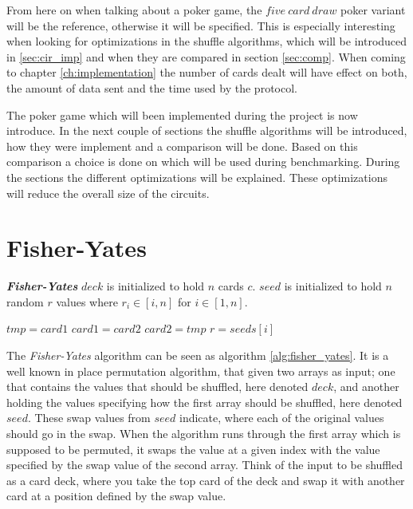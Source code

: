 \documentclass[twoside,11pt,openright]{report}
\newcommand{\FY}{\textit{Fisher-Yates} }
\begin{document}
From here on when talking about a poker game, the $five~card~draw$ poker variant will be the reference, otherwise it will be specified. This is especially interesting when looking for optimizations in the shuffle algorithms, which will be introduced in \ref{sec:cir_imp} and when they are compared in section \ref{sec:comp}. When coming to chapter \ref{ch:implementation} the number of cards dealt will have effect on both, the amount of data sent and the time used by the protocol.

\bigskip

The poker game which will been implemented during the project is now introduce. In the next couple of sections the shuffle algorithms will be introduced, how they were implement and a comparison will be done. Based on this comparison a choice is done on which will be used during benchmarking. During the sections the different optimizations will be explained. These optimizations will reduce the overall size of the circuits.


\section{Fisher-Yates}
\label{sec:fisher-yates}

\begin{algorithm}[t]
\caption{\textbf{\textit{Fisher-Yates}} \newline
    $deck$ is initialized to hold $n$ cards $c$. \newline
    $seed$ is initialized to hold $n$ random $r$ values where $r_i\in[i,n]$ for $i\in [1,n]$.
}
\label{alg:fisher_yates}

\begin{algorithmic}[t]
\State $tmp = card1$
\State $card1 = card2$
\State $card2 = tmp$
\EndFunction
\State
{}
\State $r = seeds[i]$
\State {}
\EndFor
\EndFunction
\end{algorithmic}
\end{algorithm}

The \FY algorithm can be seen as algorithm \ref{alg:fisher_yates}. It is a well known in place permutation algorithm, that given two arrays as input; one that contains the values that should be shuffled, here denoted $deck$, and another holding the values specifying how the first array should be shuffled, here denoted $seed$. These swap values from $seed$ indicate, where each of the original values should go in the swap. When the algorithm runs through the first array which is supposed to be permuted, it swaps the value at a given index with the value specified by the swap value of the second array. Think of the input to be shuffled as a card deck, where you take the top card of the deck and swap it with another card at a position defined by the swap value.
\end{document}
